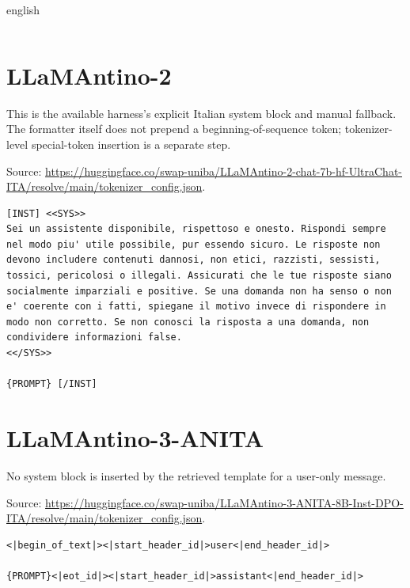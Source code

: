 \begin{otherlanguage*}{english}
\begin{lstlisting}[language={},basicstyle=\ttfamily\footnotesize,breaklines=true,breakatwhitespace=false,columns=fullflexible,keepspaces=true,showstringspaces=false,numbers=none,frame=single]
\end{lstlisting}

\section{LLaMAntino-2}
This is the available harness's explicit Italian system block and manual fallback. The formatter itself does not prepend a beginning-of-sequence token; tokenizer-level special-token insertion is a separate step.

Source: \url{https://huggingface.co/swap-uniba/LLaMAntino-2-chat-7b-hf-UltraChat-ITA/resolve/main/tokenizer_config.json}.

\begin{lstlisting}[language={},basicstyle=\ttfamily\footnotesize,breaklines=true,breakatwhitespace=false,columns=fullflexible,keepspaces=true,showstringspaces=false,numbers=none,frame=single]
[INST] <<SYS>>
Sei un assistente disponibile, rispettoso e onesto. Rispondi sempre nel modo piu' utile possibile, pur essendo sicuro. Le risposte non devono includere contenuti dannosi, non etici, razzisti, sessisti, tossici, pericolosi o illegali. Assicurati che le tue risposte siano socialmente imparziali e positive. Se una domanda non ha senso o non e' coerente con i fatti, spiegane il motivo invece di rispondere in modo non corretto. Se non conosci la risposta a una domanda, non condividere informazioni false.
<</SYS>>

{PROMPT} [/INST]
\end{lstlisting}

\section{LLaMAntino-3-ANITA}
No system block is inserted by the retrieved template for a user-only message.

Source: \url{https://huggingface.co/swap-uniba/LLaMAntino-3-ANITA-8B-Inst-DPO-ITA/resolve/main/tokenizer_config.json}.

\begin{lstlisting}[language={},basicstyle=\ttfamily\footnotesize,breaklines=true,breakatwhitespace=false,columns=fullflexible,keepspaces=true,showstringspaces=false,numbers=none,frame=single]
<|begin_of_text|><|start_header_id|>user<|end_header_id|>

{PROMPT}<|eot_id|><|start_header_id|>assistant<|end_header_id|>


\end{lstlisting}


\end{otherlanguage*}
